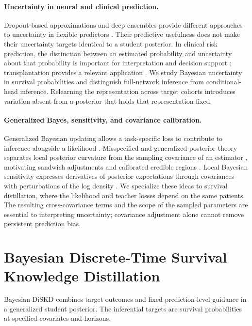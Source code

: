 \documentclass{article} %
\begin{document}
\paragraph{Uncertainty in neural and clinical prediction.}
Dropout-based approximations and deep ensembles provide different approaches to uncertainty in flexible predictors \citep{gal2016dropout,lakshminarayanan2017deepensembles}. Their predictive usefulness does not make their uncertainty targets identical to a student posterior. In clinical risk prediction, the distinction between an estimated probability and uncertainty about that probability is important for interpretation and decision support \citep{riley2025uncertainty,kompa2021second}; transplantation provides a relevant application \citep{salaun2024kidney}. We study Bayesian uncertainty in survival probabilities and distinguish full-network inference from conditional-head inference. Relearning the representation across target cohorts introduces variation absent from a posterior that holds that representation fixed.

\paragraph{Generalized Bayes, sensitivity, and covariance calibration.}
Generalized Bayesian updating allows a task-specific loss to contribute to inference alongside a likelihood \citep{bissiri2016general}. Misspecified and generalized-posterior theory separates local posterior curvature from the sampling covariance of an estimator \citep{kleijn2012,miller2021}, motivating sandwich adjustments and calibrated credible regions \citep{shaby2014,syring2019calibrating}. Local Bayesian sensitivity expresses derivatives of posterior expectations through covariances with perturbations of the log density \citep{gustafson1996sensitivity}. We specialize these ideas to survival distillation, where the likelihood and teacher losses depend on the same patients. The resulting cross-covariance terms and the scope of the sampled parameters are essential to interpreting uncertainty; covariance adjustment alone cannot remove persistent prediction bias.

\section{Bayesian Discrete-Time Survival Knowledge Distillation}
\label{sec:method}
Bayesian DiSKD combines target outcomes and fixed prediction-level guidance in a generalized student posterior. The inferential targets are survival probabilities at specified covariates and horizons.
\end{document}
